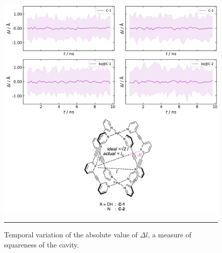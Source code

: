 \documentclass[../../main.tex]{subfiles}
\begin{document}
\begin{figure}[h!]
	\vspace{0.4cm}
	\centering
	\includegraphics[width=\textwidth]{3/da//figs/figS5}
	\vspace{0.2cm}
	\hrule
	\caption{Temporal variation of the absolute value of $\Delta l$, a measure of squareness of the cavity.}
	\label{fig::si_da_5}
\end{figure}
\end{document}
